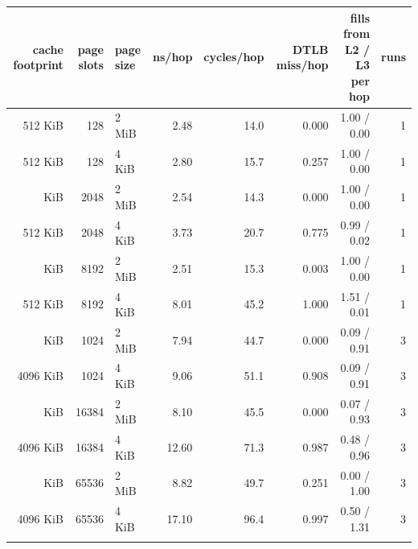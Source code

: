 \begin{tabular}{rrlrrrrr}
\toprule
cache footprint & page slots & page size & ns/hop & cycles/hop & DTLB miss/hop & fills from L2 / L3 per hop & runs \\
\midrule
512 KiB & 128 & 2 MiB & 2.48 & 14.0 & 0.000 & 1.00 / 0.00 & 1 \\
512 KiB & 128 & 4 KiB & 2.80 & 15.7 & 0.257 & 1.00 / 0.00 & 1 \\
\addlinespace
512 KiB & 2048 & 2 MiB & 2.54 & 14.3 & 0.000 & 1.00 / 0.00 & 1 \\
512 KiB & 2048 & 4 KiB & 3.73 & 20.7 & 0.775 & 0.99 / 0.02 & 1 \\
\addlinespace
512 KiB & 8192 & 2 MiB & 2.51 & 15.3 & 0.003 & 1.00 / 0.00 & 1 \\
512 KiB & 8192 & 4 KiB & 8.01 & 45.2 & 1.000 & 1.51 / 0.01 & 1 \\
\addlinespace
4096 KiB & 1024 & 2 MiB & 7.94 & 44.7 & 0.000 & 0.09 / 0.91 & 3 \\
4096 KiB & 1024 & 4 KiB & 9.06 & 51.1 & 0.908 & 0.09 / 0.91 & 3 \\
\addlinespace
4096 KiB & 16384 & 2 MiB & 8.10 & 45.5 & 0.000 & 0.07 / 0.93 & 3 \\
4096 KiB & 16384 & 4 KiB & 12.60 & 71.3 & 0.987 & 0.48 / 0.96 & 3 \\
\addlinespace
4096 KiB & 65536 & 2 MiB & 8.82 & 49.7 & 0.251 & 0.00 / 1.00 & 3 \\
4096 KiB & 65536 & 4 KiB & 17.10 & 96.4 & 0.997 & 0.50 / 1.31 & 3 \\
\addlinespace
\bottomrule
\end{tabular}
